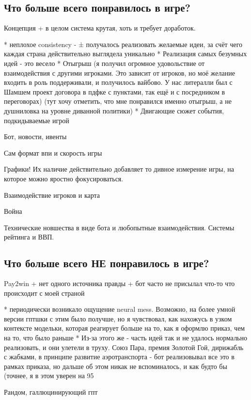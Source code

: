 \subsection*{Что больше всего понравилось в игре?}

Концепция + в целом система крутая, хоть и требует доработок.

* неплохое consistency - ± получалось реализовать желаемые идеи, за счёт чего каждая страна действительно выглядела уникально
* Реализация самых безумных идей - это весело
* Отыгрыш (я получил огромное удовольствие от взаимодействия с другими игроками. Это зависит от игроков, но моё желание входить в роль поддерживали, и получилось вайбово. У нас литералли был с Шамшем проект договора в пдфке с пунктами, так ещё и с посредником в переговорах) (тут хочу отметить, что мне понравился именно отыгрыш, а не душниловка на уровне диванной политики)
* Двигающие сюжет события, подкидываемые игрой

Бот, новости, ивенты

Сам формат впи и скорость игры

Графики! Их наличие действительно добавляет то дивное измерение игры, на которое можно яростно фокусироваться.

Взаимодействие игроков и карта

Война

Технические новшества в виде бота и любопытные взаимодействия. Системы рейтинга и ВВП.

\subsection*{Что больше всего НЕ понравилось в игре?}
Pay2win + нет одного источника правды + бот часто не присылал что-то что происходит с моей страной

* периодически возникало ощущение neural mess. Возможно, на более умной версии гптшки с этим было получше, но я чувствовал, как нахожусь в узком контексте модельки, которая реагирует больше на то, как я оформлю приказ, чем на то, что было раньше
* Из-за этого же - часть идей так и не удалось нормально реализовать, и они улетели в труху. Союз Пара, премия Золотой Гой, дирижабль с жабками, в принципе развитие аэротранспорта - бот реализовывал все это в рамках приказа, но дальше об этом никак не вспоминалось, и как будто бы (точнее, я в этом уверен на 95%

Рандом, галлюцинирующий гпт

